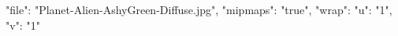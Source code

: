 {
	"file": "Planet-Alien-AshyGreen-Diffuse.jpg",
    "mipmaps": "true",
	"wrap": { 
		"u": "1",
		"v": "1"
	}
}
